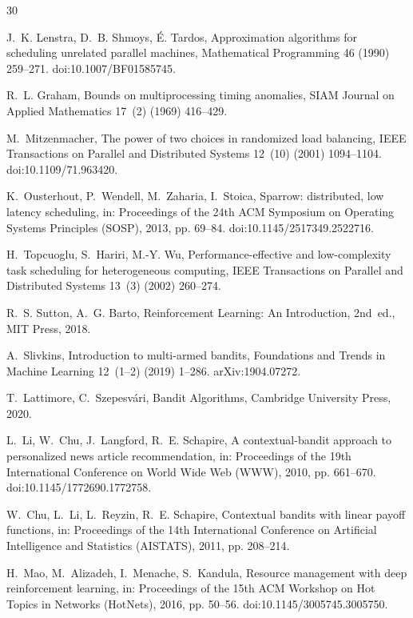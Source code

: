 \documentclass[final,5p,times,twocolumn]{elsarticle}
\begin{document}
\begin{thebibliography}{30}

 J.~K. Lenstra, D.~B. Shmoys, \'E. Tardos, Approximation algorithms for scheduling unrelated parallel machines, Mathematical Programming 46 (1990) 259--271. doi:10.1007/BF01585745.

 R.~L. Graham, Bounds on multiprocessing timing anomalies, SIAM Journal on Applied Mathematics 17~(2) (1969) 416--429.

 M.~Mitzenmacher, The power of two choices in randomized load balancing, IEEE Transactions on Parallel and Distributed Systems 12~(10) (2001) 1094--1104. doi:10.1109/71.963420.

 K.~Ousterhout, P.~Wendell, M.~Zaharia, I.~Stoica, Sparrow: distributed, low latency scheduling, in: Proceedings of the 24th ACM Symposium on Operating Systems Principles (SOSP), 2013, pp. 69--84. doi:10.1145/2517349.2522716.

 H.~Topcuoglu, S.~Hariri, M.-Y. Wu, Performance-effective and low-complexity task scheduling for heterogeneous computing, IEEE Transactions on Parallel and Distributed Systems 13~(3) (2002) 260--274.

 R.~S. Sutton, A.~G. Barto, Reinforcement Learning: An Introduction, 2nd~ed., MIT Press, 2018.

 A.~Slivkins, Introduction to multi-armed bandits, Foundations and Trends in Machine Learning 12~(1--2) (2019) 1--286. arXiv:1904.07272.

 T.~Lattimore, C.~Szepesv\'ari, Bandit Algorithms, Cambridge University Press, 2020.

 L.~Li, W.~Chu, J.~Langford, R.~E. Schapire, A contextual-bandit approach to personalized news article recommendation, in: Proceedings of the 19th International Conference on World Wide Web (WWW), 2010, pp. 661--670. doi:10.1145/1772690.1772758.

 W.~Chu, L.~Li, L.~Reyzin, R.~E. Schapire, Contextual bandits with linear payoff functions, in: Proceedings of the 14th International Conference on Artificial Intelligence and Statistics (AISTATS), 2011, pp. 208--214.

 H.~Mao, M.~Alizadeh, I.~Menache, S.~Kandula, Resource management with deep reinforcement learning, in: Proceedings of the 15th ACM Workshop on Hot Topics in Networks (HotNets), 2016, pp. 50--56. doi:10.1145/3005745.3005750.


\end{thebibliography}
\end{document}
